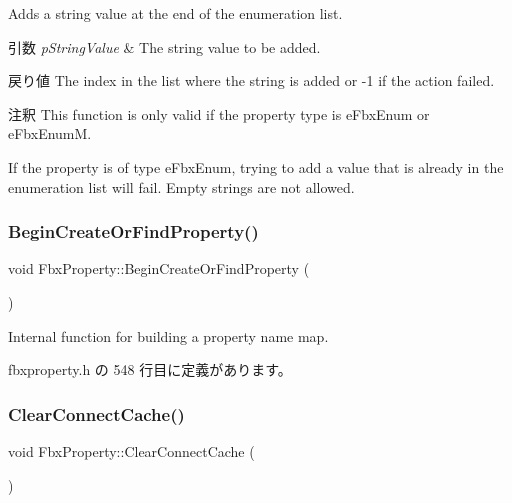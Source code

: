 Adds a string value at the end of the enumeration list. 
\begin{DoxyParams}{引数}
{\em p\+String\+Value} & The string value to be added. \\
\hline
\end{DoxyParams}
\begin{DoxyReturn}{戻り値}
The index in the list where the string is added or -\/1 if the action failed. 
\end{DoxyReturn}
\begin{DoxyRemark}{注釈}
This function is only valid if the property type is e\+Fbx\+Enum or e\+Fbx\+EnumM. 

If the property is of type e\+Fbx\+Enum, trying to add a value that is already in the enumeration list will fail. Empty strings are not allowed. 
\end{DoxyRemark}
\mbox{\label{class_fbx_property_a9305ebb4cec09a9a9dea0a36f38e2712}} 
\subsubsection{\texorpdfstring{Begin\+Create\+Or\+Find\+Property()}{BeginCreateOrFindProperty()}}
{\footnotesize\ttfamily void Fbx\+Property\+::\+Begin\+Create\+Or\+Find\+Property (\begin{DoxyParamCaption}{ }\end{DoxyParamCaption})\hspace{0.3cm}{\ttfamily [inline]}}



Internal function for building a property name map. 



 fbxproperty.\+h の 548 行目に定義があります。

\mbox{\label{class_fbx_property_abc41950bc933e9bc5454e1b5b39c4d5c}} 
\subsubsection{\texorpdfstring{Clear\+Connect\+Cache()}{ClearConnectCache()}}
{\footnotesize\ttfamily void Fbx\+Property\+::\+Clear\+Connect\+Cache (\begin{DoxyParamCaption}{ }\end{DoxyParamCaption})}



